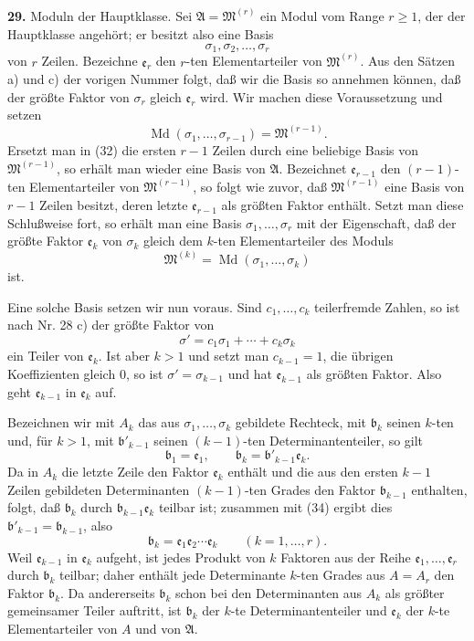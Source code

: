 \documentclass[11pt,a4paper]{article}
\begin{document}
\textbf{29.} Moduln der Hauptklasse. Sei \(\mathfrak A=\mathfrak M^{(r)}\) ein Modul vom Range \(r\ge1\), der der Hauptklasse angehört; er besitzt also eine Basis
\[
 \sigma_1,\sigma_2,\ldots,\sigma_r \tag{32}
\]
von \(r\) Zeilen. Bezeichne \(\mathfrak e_r\) den \(r\)-ten Elementarteiler von \(\mathfrak M^{(r)}\). Aus den Sätzen a) und c) der vorigen Nummer folgt, daß wir die Basis so annehmen können, daß der größte Faktor von \(\sigma_r\) gleich \(\mathfrak e_r\) wird. Wir machen diese Voraussetzung und setzen
\[
 \operatorname{Md}(\sigma_1,\ldots,\sigma_{r-1})=\mathfrak M^{(r-1)}.
\]
Ersetzt man in (32) die ersten \(r-1\) Zeilen durch eine beliebige Basis von \(\mathfrak M^{(r-1)}\), so erhält man wieder eine Basis von \(\mathfrak A\). Bezeichnet \(\mathfrak e_{r-1}\) den \((r-1)\)-ten Elementarteiler von \(\mathfrak M^{(r-1)}\), so folgt wie zuvor, daß \(\mathfrak M^{(r-1)}\) eine Basis von \(r-1\) Zeilen besitzt, deren letzte \(\mathfrak e_{r-1}\) als größten Faktor enthält. Setzt man diese Schlußweise fort, so erhält man eine Basis \(\sigma_1,\ldots,\sigma_r\) mit der Eigenschaft, daß der größte Faktor \(\mathfrak e_k\) von \(\sigma_k\) gleich dem \(k\)-ten Elementarteiler des Moduls
\[
 \mathfrak M^{(k)}=\operatorname{Md}(\sigma_1,\ldots,\sigma_k)
\]
ist.

Eine solche Basis setzen wir nun voraus. Sind \(c_1,\ldots,c_k\) teilerfremde Zahlen, so ist nach Nr. 28 c) der größte Faktor von
\[
 \sigma'=c_1\sigma_1+\cdots+c_k\sigma_k \tag{33}
\]
ein Teiler von \(\mathfrak e_k\). Ist aber \(k>1\) und setzt man \(c_{k-1}=1\), die übrigen Koeffizienten gleich \(0\), so ist \(\sigma'=\sigma_{k-1}\) und hat \(\mathfrak e_{k-1}\) als größten Faktor. Also geht \(\mathfrak e_{k-1}\) in \(\mathfrak e_k\) auf.

Bezeichnen wir mit \(A_k\) das aus \(\sigma_1,\ldots,\sigma_k\) gebildete Rechteck, mit \(\mathfrak b_k\) seinen \(k\)-ten und, für \(k>1\), mit \(\mathfrak b'_{k-1}\) seinen \((k-1)\)-ten Determinantenteiler, so gilt
\[
 \mathfrak b_1=\mathfrak e_1,\qquad \mathfrak b_k=\mathfrak b'_{k-1}\mathfrak e_k. \tag{34}
\]
Da in \(A_k\) die letzte Zeile den Faktor \(\mathfrak e_k\) enthält und die aus den ersten \(k-1\) Zeilen gebildeten Determinanten \((k-1)\)-ten Grades den Faktor \(\mathfrak b_{k-1}\) enthalten, folgt, daß \(\mathfrak b_k\) durch \(\mathfrak b_{k-1}\mathfrak e_k\) teilbar ist; zusammen mit (34) ergibt dies \(\mathfrak b'_{k-1}=\mathfrak b_{k-1}\), also
\[
 \mathfrak b_k=\mathfrak e_1\mathfrak e_2\cdots\mathfrak e_k
 \qquad(k=1,\ldots,r). \tag{35}
\]
Weil \(\mathfrak e_{k-1}\) in \(\mathfrak e_k\) aufgeht, ist jedes Produkt von \(k\) Faktoren aus der Reihe \(\mathfrak e_1,\ldots,\mathfrak e_r\) durch \(\mathfrak b_k\) teilbar; daher enthält jede Determinante \(k\)-ten Grades aus \(A=A_r\) den Faktor \(\mathfrak b_k\). Da andererseits \(\mathfrak b_k\) schon bei den Determinanten aus \(A_k\) als größter gemeinsamer Teiler auftritt, ist \(\mathfrak b_k\) der \(k\)-te Determinantenteiler und \(\mathfrak e_k\) der \(k\)-te Elementarteiler von \(A\) und von \(\mathfrak A\).
\end{document}
